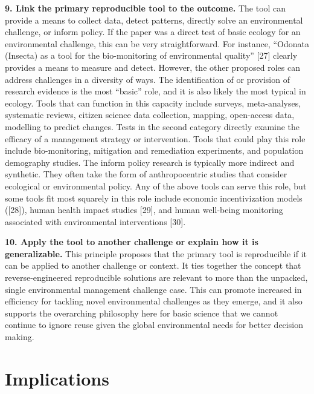 \documentclass[10pt,letterpaper]{article}
\begin{document}
\textbf{9. Link the primary reproducible tool to the outcome.} The tool
can provide a means to collect data, detect patterns, directly solve an
environmental challenge, or inform policy. If the paper was a direct
test of basic ecology for an environmental challenge, this can be very
straightforward. For instance, ``Odonata (Insecta) as a tool for the
bio-monitoring of environmental quality'' {[}27{]} clearly provides a
means to measure and detect. However, the other proposed roles can
address challenges in a diversity of ways. The identification of or
provision of research evidence is the most ``basic'' role, and it is
also likely the most typical in ecology. Tools that can function in this
capacity include surveys, meta-analyses, systematic reviews, citizen
science data collection, mapping, open-access data, modelling to predict
changes. Tests in the second category directly examine the efficacy of a
management strategy or intervention. Tools that could play this role
include bio-monitoring, mitigation and remediation experiments, and
population demography studies. The inform policy research is typically
more indirect and synthetic. They often take the form of anthropocentric
studies that consider ecological or environmental policy. Any of the
above tools can serve this role, but some tools fit most squarely in
this role include economic incentivization models ({[}28{]}), human
health impact studies {[}29{]}, and human well-being monitoring
associated with environmental interventions {[}30{]}.

\textbf{10. Apply the tool to another challenge or explain how it is
generalizable.} This principle proposes that the primary tool is
reproducible if it can be applied to another challenge or context. It
ties together the concept that reverse-engineered reproducible solutions
are relevant to more than the unpacked, single environmental management
challenge case. This can promote increased in efficiency for tackling
novel environmental challenges as they emerge, and it also supports the
overarching philosophy here for basic science that we cannot continue to
ignore reuse given the global environmental needs for better decision
making.

\section{Implications}\label{implications}
\end{document}
